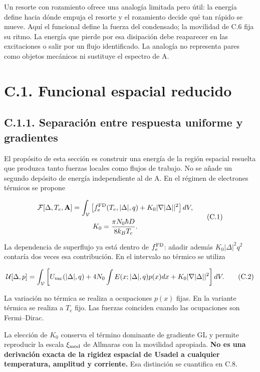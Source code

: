 \documentclass[
  spanish,
  10pt,
  a4paper,
]{article}
\begin{document}
Un resorte con rozamiento ofrece una analogía limitada pero útil: la
energía define hacia dónde empuja el resorte y el rozamiento decide qué
tan rápido se mueve. Aquí el funcional define la fuerza del condensado;
la movilidad de C.6 fija su ritmo. La energía que pierde por esa
disipación debe reaparecer en las excitaciones o salir por un flujo
identificado. La analogía no representa pares como objetos mecánicos ni
sustituye el espectro de A.

\section{C.1. Funcional espacial
reducido}\label{c.1.-funcional-espacial-reducido}

\subsection{C.1.1. Separación entre respuesta uniforme y
gradientes}\label{c.1.1.-separaciuxf3n-entre-respuesta-uniforme-y-gradientes}

El propósito de esta sección es construir una energía de la región
espacial resuelta que produzca tanto fuerzas locales como flujos de
trabajo. No se añade un segundo depósito de energía independiente al de
A. En el régimen de electrones térmicos se propone

\[
\begin{gathered}
\mathcal F[\Delta,T_e,\mathbf A]=\int_{\mathcal V}
\left[f_e^{\rm FD}(T_e,|\Delta|,q)+K_0|\nabla |\Delta||^2\right]dV,\\
K_0=\frac{\pi N_0\hbar D}{8k_BT_c}.
\end{gathered} \tag{C.1}
\]

La dependencia de superflujo ya está dentro de \(f_e^{\rm FD}\): añadir
además \(K_0|\Delta|^2q^2\) contaría dos veces esa contribución. En el
intervalo no térmico se utiliza

\[
\mathcal U[\Delta,p]=\int_{\mathcal V}
\left[U_{\rm vac}(|\Delta|,q)+4N_0\int E(x;|\Delta|,q)p(x)dx
+K_0|\nabla |\Delta||^2\right]dV. \tag{C.2}
\]

La variación no térmica se realiza a ocupaciones \(p(x)\) fijas. En la
variante térmica se realiza a \(T_e\) fijo. Las fuerzas coinciden cuando
las ocupaciones son Fermi--Dirac.

La elección de \(K_0\) conserva el término dominante de gradiente GL y
permite reproducir la escala \(\xi_{\rm mod}\) de Allmaras con la
movilidad apropiada. \textbf{No es una derivación exacta de la rigidez
espacial de Usadel a cualquier temperatura, amplitud y corriente.} Esa
distinción se cuantifica en C.8.
\end{document}
